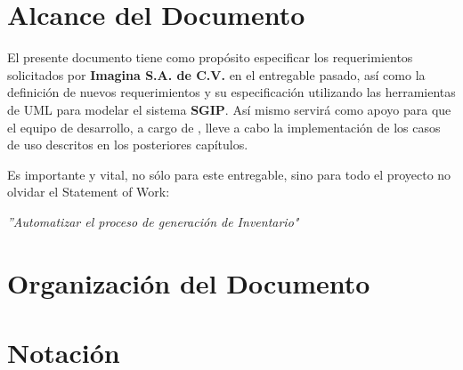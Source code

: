 \section{Alcance del Documento}

El presente documento tiene como propósito especificar los requerimientos solicitados por \textbf{Imagina S.A. de C.V.} en el entregable pasado, así como la definición de nuevos requerimientos y su especificación utilizando las herramientas de UML para modelar el sistema \textbf{SGIP}. Así mismo servirá como apoyo para que el equipo de desarrollo, a cargo de \textbf{\lider}, lleve a cabo la implementación de los casos de uso descritos en los posteriores capítulos.

Es importante y vital, no sólo para este entregable, sino para todo el proyecto no olvidar el Statement of Work:

\begin{center}
	\textit{''Automatizar el proceso de generación de Inventario"}
\end{center}

\section{Organización del Documento}


\section{Notación}

\notacion





